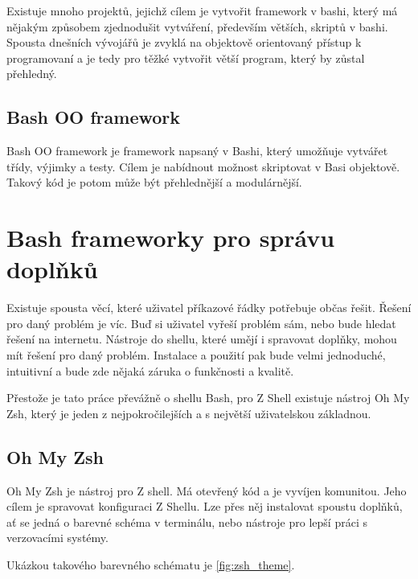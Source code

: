 \documentclass[thesis=M,czech]{FITthesis}[2012/06/26]
\begin{document}
Existuje mnoho projektů, jejichž cílem je vytvořit framework v bashi, který má nějakým způsobem zjednodušit vytváření, především větších, skriptů v bashi. Spousta dnešních vývojářů je zvyklá na objektově orientovaný přístup k programovaní a je tedy pro těžké vytvořit větší program, který by zůstal přehledný.

\subsection{Bash OO framework}
Bash OO framework je framework napsaný v Bashi, který umožňuje vytvářet třídy, výjimky a testy. Cílem je nabídnout možnost skriptovat  v Basi objektově. Takový kód je potom může být přehlednější a modulárnější.


%
%
%
%
%

\section{Bash frameworky pro správu doplňků}

Existuje spousta věcí, které uživatel příkazové řádky potřebuje občas řešit. Řešení pro daný problém je víc. Buď si uživatel vyřeší problém sám, nebo bude hledat řešení na internetu. Nástroje do shellu, které umějí i spravovat doplňky, mohou mít řešení pro daný problém. Instalace a použití pak bude velmi jednoduché, intuitivní a bude zde nějaká záruka o funkčnosti a kvalitě.

Přestože je tato práce převážně o shellu Bash, pro Z Shell existuje nástroj Oh My Zsh, který je jeden z nejpokročilejších a s největší uživatelskou základnou.

%
%
%
\subsection{Oh My Zsh}

Oh My Zsh je nástroj pro Z shell. Má otevřený kód a je vyvíjen komunitou. Jeho cílem je spravovat konfiguraci Z Shellu. Lze přes něj instalovat spoustu doplňků, ať se jedná o barevné schéma v terminálu, nebo nástroje pro lepší práci s verzovacími systémy.

Ukázkou takového barevného schématu je \ref{fig:zsh_theme}.
\end{document}
